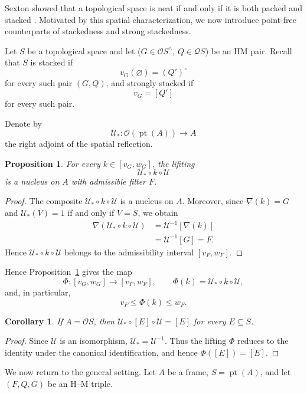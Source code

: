 \documentclass[11pt]{amsart}
\DeclareMathOperator{\pt}{pt}
\theoremstyle{plain}
\newtheorem{cor}[thm]{Corollary}
\newtheorem{prop}[thm]{Proposition}
\theoremstyle{definition}
\begin{document}
Sexton showed that a topological space is neat if and
only if it is both packed and stacked
\cite[Theorem 6.2]{sexton2006ordinal}. Motivated by this spatial
characterization, we now introduce point-free
counterparts of stackedness and strong stackedness.

Let $S$ be a topological space and let ($G\in \mathcal{O}S^\wedge$, $Q\in \mathcal{Q}S$) be an HM pair.
Recall that $S$ is stacked if
\[
v_G(\varnothing)=(Q')^\circ
\]
for every such pair $(G,Q)$, and strongly stacked if
\[
v_G=[Q']
\]
for every such pair.

Denote by
\[
\mathcal U_*\colon \mathcal O(\pt(A))\to A
\] 
the right adjoint of the spatial reflection. 
\begin{prop}\label{morfismo} 
For every $k\in[v_G,w_G]$, the lifiting
\[
\mathcal U_*\circ k\circ\mathcal U
\]
is a nucleus on $A$ with admissible filter $F$.
\end{prop}

\begin{proof}
The composite $\mathcal U_*\circ k\circ \mathcal{U}$
is a nucleus on $A$. Moreover, since
$\nabla(k)=G$ and
$\mathcal U_*(V)=1$ if and only if $V=S$,
we obtain
\[
\begin{aligned}
\nabla(\mathcal U_*\circ k\circ\mathcal U)
&=\mathcal U^{-1}[\nabla(k)]\\
&=\mathcal U^{-1}[G]
=F.
\end{aligned}
\]
Hence $\mathcal U_*\circ k\circ\mathcal U$ belongs
to the admissibility interval $[v_F,w_F]$.
\end{proof}

Hence Proposition~\ref{morfismo} gives the map
\[
\Phi\colon [v_G,w_G]\longrightarrow[v_F,w_F],
\qquad
\Phi(k)=\mathcal U_*\circ k\circ\mathcal U,
\]
and, in particular,
\[
v_F\leq\Phi(k)\leq w_F.
\]

\begin{cor}\label{lem:auxiliar}
If $A=\mathcal OS$, then $\mathcal U_*\circ[E]\circ\mathcal U=[E]$
for every $E\subseteq S$.
\end{cor}

\begin{proof}
Since $\mathcal U$ is an isomorphism,
$\mathcal U_*=\mathcal U^{-1}$. Thus the
lifting $\Phi$ reduces to the identity
under the canonical identification, and
hence $\Phi([E])=[E]$.
\end{proof}

We now return to the general setting. Let \(A\) be a frame, \(S=\pt(A)\), and let \((F,Q,G)\) be an H--M triple. 
\end{document}
